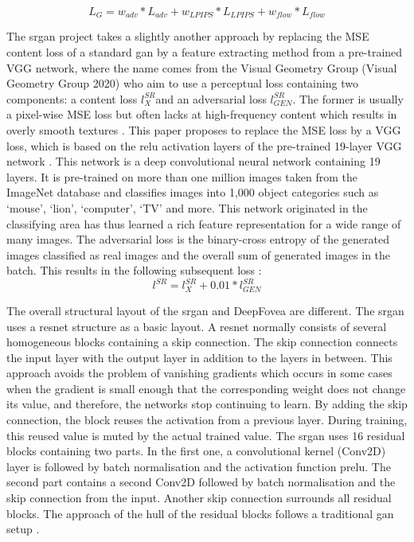 \[ L_G = w_{adv}*L_{adv}+w_{LPIPS}*L_{LPIPS}+w_{flow}*L_{flow} \]
\par
The \gls{srgan} project takes a slightly another approach by replacing the MSE content loss of a standard \gls{gan} by a feature extracting method from a pre-trained VGG network, where the name comes from the Visual Geometry Group (Visual Geometry Group 2020) who aim to use a perceptual loss containing two components: a content loss \(l^{SR}_{X}\)and an adversarial loss \(l^{SR}_{GEN}\). The former is usually a pixel-wise MSE loss but often lacks at high-frequency content which results in overly smooth textures \parencite{Ledig2017}. This paper proposes to replace the MSE loss by a VGG loss, which is based on the \gls{relu} activation layers of the pre-trained 19-layer VGG network \parencite{simonyan2015}. This network is a deep convolutional neural network containing 19 layers. It is pre-trained on more than one million images taken from the ImageNet database \parencite{Russakovsky2015} and classifies images into 1,000 object categories such as ‘mouse’, ‘lion’, ‘computer’, ‘TV’ and more. This network originated in the classifying area has thus learned a rich feature representation for a wide range of many images. The adversarial loss is the binary-cross entropy of the generated images classified as real images and the overall sum of generated images in the batch. This results in the following subsequent loss \parencite{Ledig2017}:
\[l^{SR} = l^{SR}_{X} + 0.01 * l^{SR}_{GEN}\]
\par
The overall structural layout of the \gls{srgan} and DeepFovea are different. The \gls{srgan} uses a \gls{resnet} structure as a basic layout. A \gls{resnet} normally consists of several homogeneous blocks containing a skip connection. The skip connection connects the input layer with the output layer in addition to the layers in between. This approach avoids the problem of vanishing gradients which occurs in some cases when the gradient is small enough that the corresponding weight does not change its value, and therefore, the networks stop continuing to learn. By adding the skip connection, the block reuses the activation from a previous layer. During training, this reused value is muted by the actual trained value. The \gls{srgan} uses 16 residual blocks containing two parts. In the first one, a convolutional kernel (Conv2D) layer is followed by batch normalisation and the activation function \gls{prelu}. The second part contains a second Conv2D followed by batch normalisation and the skip connection from the input. Another skip connection surrounds all residual blocks. The approach of the hull of the residual blocks follows a traditional \gls{gan} setup \parencite{Ledig2017}.
